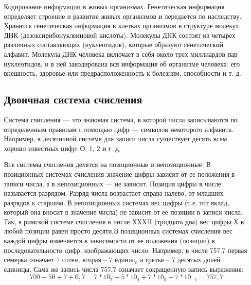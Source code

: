 \documentclass[a4paper]{article}
\begin{document}
 Кодирование информации в живых организмах. Генетическая информация определяет строение и развитие живых организмов и передается по наследству. Хранится генетическая информация в клетках организмов в структуре молекул ДНК (дезоксирибонуклеиновой кислоты). Молекулы ДНК состоят из четырех различных составляющих (нуклеотидов), которые образуют генетический алфавит. Молекула ДНК человека включает в себя около трех миллиардов пар нуклеотидов, и в ней закодирована вся информация об организме человека: его внешность, здоровье или предрасположенность к болезням, способности и т. д.

\subsection{Двоичная система счисления}
Система счисления — это знаковая система, в которой числа записываются по определенным правилам с помощью цифр — символов некоторого алфавита. Например, в десятичной системе для записи числа существует десять всем хорошо известных цифр: О, 1, 2 и т. д.

Все системы счисления делятся на позиционные и непозиционные. В позиционных системах счисления значение цифры зависит от ее положения в записи числа, а в непозиционных — не зависит. Позиция цифры в числе называется разрядом. Разряд числа возрастает справа налево, от младших разрядов к старшим. В непозиционных системах вес цифры (т.е. тот вклад, который она вносит в значение числа) не зависит от ее позиции в записи числа. Так, в римской системе счисления в числе ХХХII (тридцать два) вес цифры Х в любой позиции равен просто десяти.В позиционных системах счисления вес каждой цифры изменяется в зависимости от ее положения (позиции) в последовательности цифр, изображающих число. Например, в числе 757,7 первая семерка означает 7 сотен, вторая – 7 единиц, а третья – 7 десятых долей единицы. Сама же запись числа 757,7 означает сокращенную запись выражения:
\begin{equation}
  700 + 50 + 7 + 0,7 = 7*10_{2} + 5*10_{1} + 7*10_{0} + 7*10_{-1} = 757,7
\end{equation}
\end{document}
